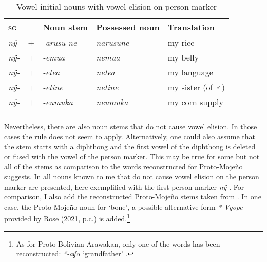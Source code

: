\begin{table}[t]
\caption{Vowel-initial nouns with vowel elision on person marker}

\begin{tabular}{lllll}
\lsptoprule
1\textsc{sg} & & Noun stem & Possessed noun & Translation\\
\midrule
	\textit{nÿ-}  & + & \textit{-arusu-ne} &  \textit{narusune} & my rice\\
	\textit{nÿ-}  & + & \textit{-emua} &  \textit{nemua} & my belly\\
	\textit{nÿ-} & + & \textit{-etea} & \textit{netea} & my language \\
	\textit{nÿ-}  & + & \textit{-etine} &  \textit{netine} & my sister (of ♂︎) \\
	\textit{nÿ-}  & + & \textit{-eumuka} & \textit{neumuka} & my corn supply\\
\lspbottomrule
\end{tabular}

\label{table:noun-elision}
\end{table}


Nevertheless, there are also noun stems that do not cause vowel elision. In those cases the rule does not seem to apply. Alternatively, one could also assume that the stem starts with a diphthong and the first vowel of the diphthong is deleted or fused with the vowel of the person marker. This may be true for some but not all of the stems as comparison to the words reconstructed for Proto-Mojeño suggests. In  all nouns known to me that do not cause vowel elision on the person marker are presented, here exemplified with the first person marker \textit{nÿ-}. For comparison, I also add the reconstructed Proto-Mojeño stems taken from \citet[]{CarvalhoRose2018}. In one case, the Proto-Mojeño noun for ‘bone’, a possible alternative form \textit{*-Vyope} provided by Rose (2021, p.c.) is added.\footnote{As for Proto-Bolivian-Arawakan, only one of the words has been reconstructed: \textit{*-aʧʊ} ‘grandfather’ \citep[cf.][65]{RamirezFranca2019}.} 


